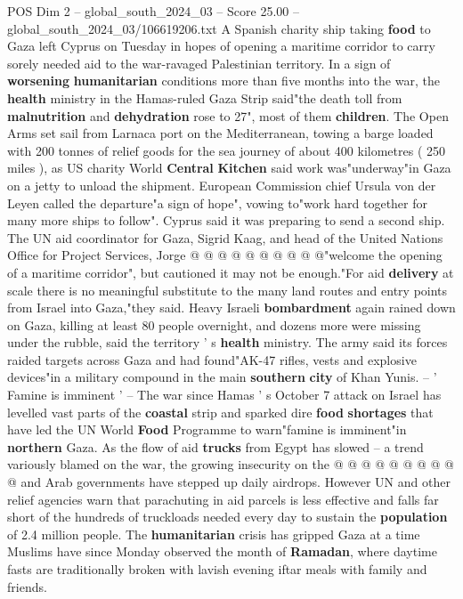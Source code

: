 \begin{textsample}{POS Dim 2 – global\_south\_2024\_03 – Score 25.00 – global\_south\_2024\_03/106619206.txt}  \label{ex:f2_pos_015}
A Spanish charity ship taking \textbf{food} to Gaza left Cyprus on Tuesday in hopes of opening a maritime corridor to carry sorely needed aid to the war-ravaged Palestinian territory.
In a sign of \textbf{worsening} \textbf{humanitarian} conditions more than five months into the war, the \textbf{health} ministry in the Hamas-ruled Gaza Strip said"the death toll from \textbf{malnutrition} and \textbf{dehydration} rose to 27", most of them \textbf{children}.
The Open Arms set sail from Larnaca port on the Mediterranean, towing a barge loaded with 200 tonnes of relief goods for the sea journey of about 400 kilometres ( 250 miles ), as US charity World \textbf{Central} \textbf{Kitchen} said work was"underway"in Gaza on a jetty to unload the shipment.
European Commission chief Ursula von der Leyen called the departure"a sign of hope", vowing to"work hard together for many more ships to follow".
Cyprus said it was preparing to send a second ship.
The UN aid coordinator for Gaza, Sigrid Kaag, and head of the United Nations Office for Project Services, Jorge @ @ @ @ @ @ @ @ @ @"welcome the opening of a maritime corridor", but cautioned it may not be enough."For aid \textbf{delivery} at scale there is no meaningful substitute to the many land routes and entry points from Israel into Gaza,"they said.
Heavy Israeli \textbf{bombardment} again rained down on Gaza, killing at least 80 people overnight, and dozens more were missing under the rubble, said the territory ' s \textbf{health} ministry.
The army said its forces raided targets across Gaza and had found"AK-47 rifles, vests and explosive devices"in a military compound in the main \textbf{southern} \textbf{city} of Khan Yunis. -- ' Famine is imminent ' -- The war since Hamas ' s October 7 attack on Israel has levelled vast parts of the \textbf{coastal} strip and sparked dire \textbf{food} \textbf{shortages} that have led the UN World \textbf{Food} Programme to warn"famine is imminent"in \textbf{northern} Gaza.
As the flow of aid \textbf{trucks} from Egypt has slowed -- a trend variously blamed on the war, the growing insecurity on the @ @ @ @ @ @ @ @ @ @ and Arab governments have stepped up daily airdrops.
However UN and other relief agencies warn that parachuting in aid parcels is less effective and falls far short of the hundreds of truckloads needed every day to sustain the \textbf{population} of 2.4 million people.
The \textbf{humanitarian} crisis has gripped Gaza at a time Muslims have since Monday observed the month of \textbf{Ramadan}, where daytime fasts are traditionally broken with lavish evening iftar meals with family and friends.

\end{textsample}
